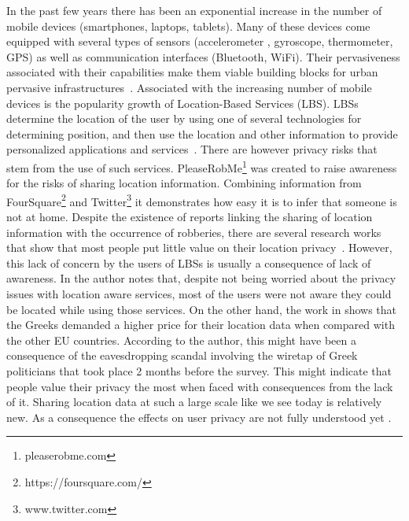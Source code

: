 In the past few years there has been an exponential increase in the
number of mobile devices (smartphones, laptops, tablets). Many of
these devices come equipped with several types of sensors
(accelerometer , gyroscope, thermometer, GPS) as well as communication
interfaces (Bluetooth, WiFi). Their pervasiveness associated with
their capabilities make them viable building blocks for urban
pervasive infrastructures~\cite{kostakos2009understanding}. Associated
with the increasing number of mobile devices is the popularity growth
of Location-Based Services (LBS)\cite{zickuhr2012three}. LBSs
determine the location of the user by using one of several
technologies for determining position, and then use the location and
other information to provide personalized applications and
services~\cite{zibuschka2011location}. There are however privacy risks
that stem from the use of such services.
PleaseRobMe\footnote{pleaserobme.com} was created to raise awareness
for the risks of sharing location information. Combining information
from FourSquare\footnote{https://foursquare.com/} and
Twitter\footnote{www.twitter.com} it demonstrates how easy it is to
infer that someone is not at home. Despite the existence of reports
linking the sharing of location information with the occurrence of
robberies\cite{Grove:2009:Online,Dybwad:2009:Online}, there are
several research works that show that most people put little value on
their location privacy~\cite{ahern2007over,colbert2001diary,
  Cvrcek:2006:SVL:1179601.1179621,kaasinen2003user}. However, this
lack of concern by the users of LBSs is usually a consequence of lack
of awareness. In \cite{kaasinen2003user} the author notes that,
despite not being worried about the privacy issues with location aware
services, most of the users were not aware they could be located while
using those services. On the other hand, the work in
\cite{Cvrcek:2006:SVL:1179601.1179621} shows that the Greeks demanded
a higher price for their location data when compared with the other EU
countries. According to the author, this might have been a consequence
of the eavesdropping scandal involving the wiretap of Greek
politicians that took place 2 months before the survey. This might
indicate that people value their privacy the most when faced with
consequences from the lack of it. Sharing location data at such a
large scale like we see today is relatively new. As a consequence the
effects on user privacy are not fully understood
yet \cite{Terrovitis:2011:PPD:2031331.2031334}.


